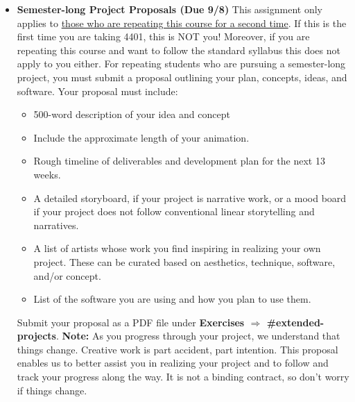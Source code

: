 \def\dMon{2/1}%
\def\dTues{2/2}%
\def\dWed{2/3}%
\def\dThur{2/4}%
\placeDate

\def\tues{9/8}%
\def\thur{9/10}%
% 
\begin{itemize}[noitemsep,topsep=0pt,leftmargin=*]
    \item \textbf{Semester-long Project Proposals (Due \tues)} This assignment only applies to \ul{those who are repeating this course for a second time}. If this is the first time you are taking 4401, this is NOT you! Moreover, if you are repeating this course and want to follow the standard syllabus this does not apply to you either. For repeating students who are pursuing a semester-long project, you must submit a proposal outlining your plan, concepts, ideas, and software. Your proposal must include:
          \begin{itemize}
              \item 500-word description of your idea and concept
              \item Include the approximate length of your animation.
              \item Rough timeline of deliverables and development plan for the next 13 weeks.
              \item A detailed storyboard, if your project is narrative work, or a mood board if your project does not follow conventional linear storytelling and narratives.
              \item A list of artists whose work you find inspiring in realizing your own project. These can be curated based on aesthetics, technique, software, and/or concept.
              \item List of the software you are using and how you plan to use them.
          \end{itemize}
    Submit your proposal as a PDF file under \textbf{Exercises $\Rightarrow$ \#extended-projects}. \newline
    \small{\textbf{Note:} As you progress through your project, we understand that things change. Creative work is part accident, part intention. This proposal enables us to better assist you in realizing your project and to follow and track your progress along the way. It is not a binding contract, so don't worry if things change.}
\end{itemize}
\vspace{1em}
